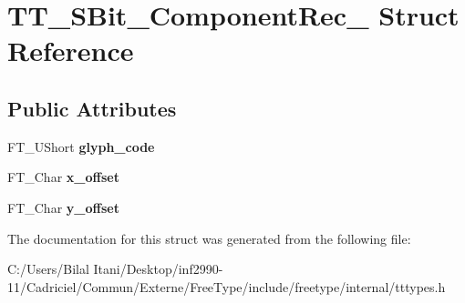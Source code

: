 \hypertarget{struct_t_t___s_bit___component_rec__}{}\section{T\+T\+\_\+\+S\+Bit\+\_\+\+Component\+Rec\+\_\+ Struct Reference}
\label{struct_t_t___s_bit___component_rec__}
\subsection*{Public Attributes}
\begin{DoxyCompactItemize}
\item 
F\+T\+\_\+\+U\+Short {\bfseries glyph\+\_\+code}\hypertarget{struct_t_t___s_bit___component_rec___a357eef9c05c65034b506cdd48271e562}{}\label{struct_t_t___s_bit___component_rec___a357eef9c05c65034b506cdd48271e562}

\item 
F\+T\+\_\+\+Char {\bfseries x\+\_\+offset}\hypertarget{struct_t_t___s_bit___component_rec___a97799704aa59bf737e274289fa70ca3f}{}\label{struct_t_t___s_bit___component_rec___a97799704aa59bf737e274289fa70ca3f}

\item 
F\+T\+\_\+\+Char {\bfseries y\+\_\+offset}\hypertarget{struct_t_t___s_bit___component_rec___af24f91b7d5e0268a223514ad68a9a10b}{}\label{struct_t_t___s_bit___component_rec___af24f91b7d5e0268a223514ad68a9a10b}

\end{DoxyCompactItemize}


The documentation for this struct was generated from the following file\+:\begin{DoxyCompactItemize}
\item 
C\+:/\+Users/\+Bilal Itani/\+Desktop/inf2990-\/11/\+Cadriciel/\+Commun/\+Externe/\+Free\+Type/include/freetype/internal/tttypes.\+h\end{DoxyCompactItemize}
